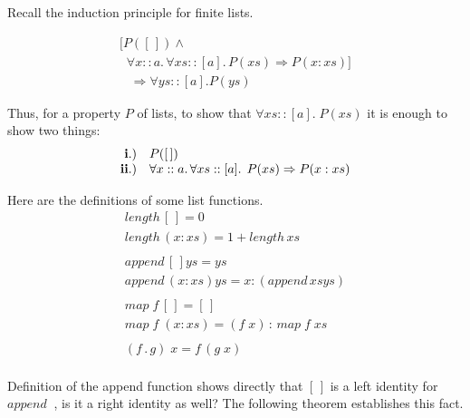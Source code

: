 \documentclass[11pt]{article}
\newcommand{\appenda}[2]{{\mathit{append}}\;{#1}\;{#2}}
\renewcommand{\nil}{[\,]}
\begin{document}


Recall the induction principle for finite lists.

\[\begin{array}{l}

[P([\,]) \wedge \\
\;\;\forall x::a.\, \forall xs::[a].\, P(xs) \Rightarrow P(x:xs)] \\
\;\;\; \Rightarrow \forall{}ys::[a]. P(ys)
\end{array}\]

Thus, for a property $P$ of lists, to show that $\forall{}xs::[a].\; P(xs)$
it is enough to show two things:
\[\begin{array}{rl}
{\bf{i.)}} & P([\,]) \\
{\bf{ii.)}} & \forall x::a.\, \forall xs::[a].\,\; P(xs) \Rightarrow P(x:xs)\\
\end{array}\]

Here are the definitions of some list functions.
\[\begin{array}{l}

length\, [\,] = 0  \\
length\, (x:xs) = 1 + length\, xs \\
\ \\
append\, [\,] ys = ys \\
append\, (x:xs) ys = x: (append\, xs ys) \\
\ \\
map\; f\, [\,] = [\,] \\
map \; f \; (x:xs) = (f\; x)\, :\, map \; f \; xs \\
\ \\
(f\, .\, g)\; x = f\, (g\; x)\\

\end{array}\]



Definition of the append function shows directly that $\nil$
is a left identity for $\appenda{}{}$, is it a right identity as well? The
following theorem establishes this fact.
\end{document}
